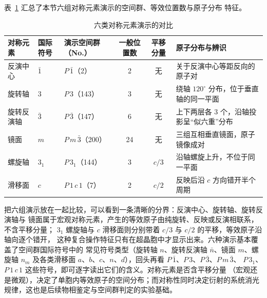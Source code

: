 表~\ref{tab:sym-summary} 汇总了本节六组对称元素演示的空间群、等效位置数与原子分布
特征。

\begin{table}[H]
  \centering
  \small
  \caption{六类对称元素演示的对比}
  \label{tab:sym-summary}
  \begin{tabular}{@{}lllccp{3.6cm}@{}}
    \toprule
    对称元素 & 国际符号 & 演示空间群（No.） & 一般位置数 & 平移分量 & 原子分布与辨识 \\
    \midrule
    反演中心 & $\bar1$ & $P\,\bar1$（2） & 2 & 无 & 关于反演中心等距反向的原子对 \\
    旋转轴 & $3$ & $P\,3$（143） & 3 & 无 & 绕轴 $120^\circ$ 分布，位于垂直轴的同一平面 \\
    旋转反演轴 & $\bar3$ & $P\,\bar3$（147） & 6 & 无 & 上下两层各 3 个，沿轴投影呈``似六重''分布 \\
    镜面 & $m$ & $P\,m\,\bar3$（200） & 24 & 无 & 三组互相垂直镜面，原子镜像成对 \\
    螺旋轴 & $3_1$ & $P\,3_1$（144） & 3 & $c/3$ & 沿轴螺旋上升，不位于同一平面 \\
    滑移面 & $c$ & $P\,1\,c\,1$（7） & 2 & $c/2$ & 反映后沿 $c$ 方向错开半个周期 \\
    \bottomrule
  \end{tabular}
\end{table}

把六组演示放在一起比较，可以看到一条清晰的分界：反演中心、旋转轴、旋转反演轴与
镜面属于宏观对称元素，产生的等效原子由纯旋转、反映或反演相联系，不含平移分量；
$3_1$ 螺旋轴与 $c$ 滑移面则分别带着 $c/3$ 与 $c/2$ 的平移，等效原子沿轴向逐个错开，
这种复合操作特征只有在超晶胞中才显示出来。六种演示基本覆盖了空间群国际符号中的
常见符号类型（旋转轴 $n$、旋转反演轴 $\bar n$、镜面 $m$、螺旋轴 $n_m$ 及各类滑移面
$a$、$b$、$c$、$n$、$d$），回头再看 $P\,\bar1$、$P\,3$、$P\,\bar3$、$P\,m\,\bar3$、
$P\,3_1$、$P\,1\,c\,1$ 这些符号，即可逐字读出它们的含义。对称元素是否含平移分量
（宏观还是微观），决定了单胞内等效原子的空间分布；而对称性同时决定衍射的系统消光
规律，这也是后续物相鉴定与空间群判定的实验基础。
